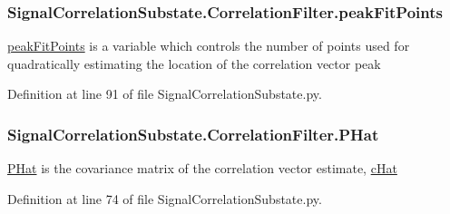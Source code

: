 \subsubsection[{\texorpdfstring{peak\+Fit\+Points}{peakFitPoints}}]{\setlength{\rightskip}{0pt plus 5cm}Signal\+Correlation\+Substate.\+Correlation\+Filter.\+peak\+Fit\+Points}\hypertarget{classSignalCorrelationSubstate_1_1CorrelationFilter_a85a73739e9bb0a7f20886a812a3afa83}{}\label{classSignalCorrelationSubstate_1_1CorrelationFilter_a85a73739e9bb0a7f20886a812a3afa83}


\hyperlink{classSignalCorrelationSubstate_1_1CorrelationFilter_a85a73739e9bb0a7f20886a812a3afa83}{peak\+Fit\+Points} is a variable which controls the number of points used for quadratically estimating the location of the correlation vector peak 



Definition at line 91 of file Signal\+Correlation\+Substate.\+py.

\subsubsection[{\texorpdfstring{P\+Hat}{PHat}}]{\setlength{\rightskip}{0pt plus 5cm}Signal\+Correlation\+Substate.\+Correlation\+Filter.\+P\+Hat}\hypertarget{classSignalCorrelationSubstate_1_1CorrelationFilter_a9b079080abde4a661f95687e8ea89827}{}\label{classSignalCorrelationSubstate_1_1CorrelationFilter_a9b079080abde4a661f95687e8ea89827}


\hyperlink{classSignalCorrelationSubstate_1_1CorrelationFilter_a9b079080abde4a661f95687e8ea89827}{P\+Hat} is the covariance matrix of the correlation vector estimate, \hyperlink{classSignalCorrelationSubstate_1_1CorrelationFilter_ad07b1d484b9ab77a1a8fc215f10faf15}{c\+Hat} 



Definition at line 74 of file Signal\+Correlation\+Substate.\+py.


